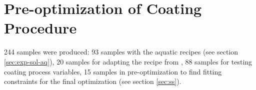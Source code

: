 \section{Pre-optimization of Coating Procedure}
\label{sec:exp-preopt}
244 samples were produced: 93 samples with the aquatic recipes (see section \ref{sec:exp-sol-aq}), 20 samples for adapting the recipe from \cite{Hu2016}, 88 samples for testing coating process variables, 15 samples in pre-optimization to find fitting constraints for the final optimization (see section \ref{sec:ss}). 

